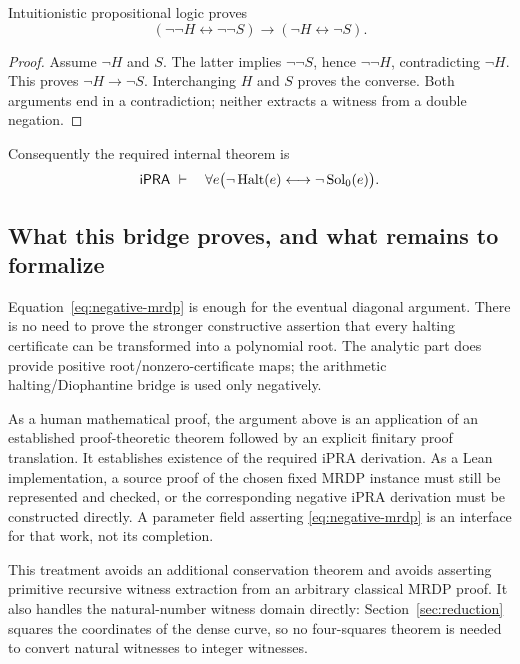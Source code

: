 \begin{lemma}\label{lem:negative-calibration}
Intuitionistic propositional logic proves
\[
 (\neg\neg H\leftrightarrow\neg\neg S)
 \longrightarrow(\neg H\leftrightarrow\neg S).
\]
\end{lemma}
\begin{proof}
Assume $\neg H$ and $S$. The latter implies $\neg\neg S$, hence
$\neg\neg H$, contradicting $\neg H$. This proves $\neg H\to\neg S$.
Interchanging $H$ and $S$ proves the converse. Both arguments end in a
contradiction; neither extracts a witness from a double negation.
\end{proof}

Consequently the required internal theorem is
\begin{equation}\label{eq:negative-mrdp}
 \mathsf{iPRA}\ \vdash\quad
 \forall e\bigl(\neg\operatorname{Halt}(e)\longleftrightarrow\neg\operatorname{Sol}_0(e)\bigr).
\end{equation}

\subsection{What this bridge proves, and what remains to formalize}

Equation~\eqref{eq:negative-mrdp} is enough for the eventual diagonal
argument. There is no need to prove the stronger constructive assertion
that every halting certificate can be transformed into a polynomial root.
The analytic part does provide positive root/nonzero-certificate maps;
the arithmetic halting/Diophantine bridge is used only negatively.

As a human mathematical proof, the argument above is an application of an
established proof-theoretic theorem followed by an explicit finitary proof
translation. It establishes existence of the required iPRA derivation.
As a Lean implementation, a source proof of the chosen fixed MRDP
instance must still be represented and checked, or the corresponding
negative iPRA derivation must be constructed directly. A parameter field
asserting \eqref{eq:negative-mrdp} is an interface for that work, not its
completion.

This treatment avoids an additional conservation theorem and avoids
asserting primitive recursive witness extraction from an arbitrary
classical MRDP proof. It also handles the natural-number witness domain
directly: Section~\ref{sec:reduction} squares the coordinates of the dense
curve, so no four-squares theorem is needed to convert natural witnesses
to integer witnesses.
